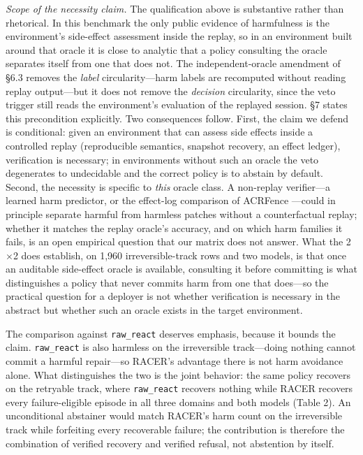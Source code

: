 \documentclass[review]{fcs}
\begin{document}
\emph{Scope of the necessity claim.} The qualification above is substantive rather than rhetorical. In this benchmark the only public evidence of harmfulness is the environment's side-effect assessment inside the replay, so in an environment built around that oracle it is close to analytic that a policy consulting the oracle separates itself from one that does not. The independent-oracle amendment of \S6.3 removes the \emph{label} circularity---harm labels are recomputed without reading replay output---but it does not remove the \emph{decision} circularity, since the veto trigger still reads the environment's evaluation of the replayed session. \S7 states this precondition explicitly. Two consequences follow. First, the claim we defend is conditional: given an environment that can assess side effects inside a controlled replay (reproducible semantics, snapshot recovery, an effect ledger), verification is necessary; in environments without such an oracle the veto degenerates to undecidable and the correct policy is to abstain by default. Second, the necessity is specific to \emph{this} oracle class. A non-replay verifier---a learned harm predictor, or the effect-log comparison of ACRFence \cite{ref11}---could in principle separate harmful from harmless patches without a counterfactual replay; whether it matches the replay oracle's accuracy, and on which harm families it fails, is an open empirical question that our matrix does not answer. What the 2$\times$2 does establish, on 1,960 irreversible-track rows and two models, is that once an auditable side-effect oracle is available, consulting it before committing is what distinguishes a policy that never commits harm from one that does---so the practical question for a deployer is not whether verification is necessary in the abstract but whether such an oracle exists in the target environment.

The comparison against \texttt{raw\_react} deserves emphasis, because it bounds the claim. \texttt{raw\_react} is also harmless on the irreversible track---doing nothing cannot commit a harmful repair---so RACER's advantage there is not harm avoidance alone. What distinguishes the two is the joint behavior: the same policy recovers on the retryable track, where \texttt{raw\_react} recovers nothing while RACER recovers every failure-eligible episode in all three domains and both models (Table 2). An unconditional abstainer would match RACER's harm count on the irreversible track while forfeiting every recoverable failure; the contribution is therefore the combination of verified recovery and verified refusal, not abstention by itself.
\end{document}
